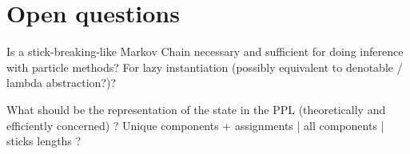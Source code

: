 \section{Open questions}
Is a stick-breaking-like Markov Chain necessary and sufficient for doing inference with particle methods? For lazy instantiation (possibly equivalent to denotable / lambda abstraction?)?

What should be the representation of the state in the PPL (theoretically and efficiently concerned) ? Unique components + assignments | all components | sticks lengths ?   
